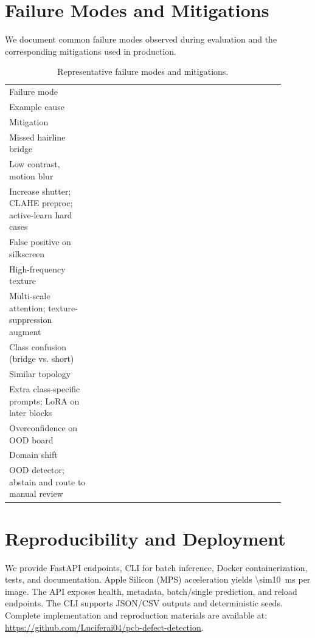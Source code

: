 \documentclass[conference]{IEEEtran}
\begin{document}
\section{Failure Modes and Mitigations}
We document common failure modes observed during evaluation and the corresponding mitigations used in production.
\begin{table}[!t]
  \centering
  \caption{Representative failure modes and mitigations.}
  \label{tab:failures}
  \vspace{2pt}
  \begin{tabular}{@{}p{0.28\linewidth}p{0.34\linewidth}p{0.28\linewidth}@{}}
    \toprule
    Failure mode \\ Example cause \\ Mitigation \\
    \midrule
    Missed hairline bridge \\ Low contrast, motion blur \\ Increase shutter; CLAHE preproc; active-learn hard cases \\
    False positive on silkscreen \\ High-frequency texture \\ Multi-scale attention; texture-suppression augment \\
    Class confusion (bridge vs. short) \\ Similar topology \\ Extra class-specific prompts; LoRA on later blocks \\
    Overconfidence on OOD board \\ Domain shift \\ OOD detector; abstain and route to manual review \\
    \bottomrule
  \end{tabular}
\end{table}

\section{Reproducibility and Deployment}
We provide FastAPI endpoints, CLI for batch inference, Docker containerization, tests, and documentation. Apple Silicon (MPS) acceleration yields \SI{\sim10}{ms} per image. The API exposes health, metadata, batch/single prediction, and reload endpoints. The CLI supports JSON/CSV outputs and deterministic seeds. Complete implementation and reproduction materials are available at: \url{https://github.com/Luciferai04/pcb-defect-detection}.
\end{document}
